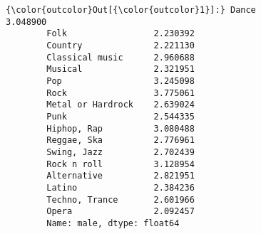 \documentclass[11pt]{article}
\begin{document}
\begin{Verbatim}[commandchars=\\\{\}]
{\color{outcolor}Out[{\color{outcolor}1}]:} Dance                3.048900
        Folk                 2.230392
        Country              2.221130
        Classical music      2.960688
        Musical              2.321951
        Pop                  3.245098
        Rock                 3.775061
        Metal or Hardrock    2.639024
        Punk                 2.544335
        Hiphop, Rap          3.080488
        Reggae, Ska          2.776961
        Swing, Jazz          2.702439
        Rock n roll          3.128954
        Alternative          2.821951
        Latino               2.384236
        Techno, Trance       2.601966
        Opera                2.092457
        Name: male, dtype: float64
\end{Verbatim}
            
\end{document}
